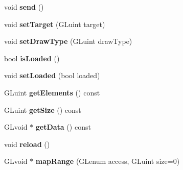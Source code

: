\begin{DoxyCompactItemize}
\item 
void {\bfseries send} ()\hypertarget{classflw_1_1flc_1_1IBuffer_a0fa4b45e543ed7f945f8d216628e7c53}{}\label{classflw_1_1flc_1_1IBuffer_a0fa4b45e543ed7f945f8d216628e7c53}

\item 
void {\bfseries set\+Target} (G\+Luint target)\hypertarget{classflw_1_1flc_1_1IBuffer_a7d73a5dcb2cc252fe329565a4c329433}{}\label{classflw_1_1flc_1_1IBuffer_a7d73a5dcb2cc252fe329565a4c329433}

\item 
void {\bfseries set\+Draw\+Type} (G\+Luint draw\+Type)\hypertarget{classflw_1_1flc_1_1IBuffer_a641903dd05dbe080d8f761ec55bffa97}{}\label{classflw_1_1flc_1_1IBuffer_a641903dd05dbe080d8f761ec55bffa97}

\item 
bool {\bfseries is\+Loaded} ()\hypertarget{classflw_1_1flc_1_1IBuffer_a5d6c3aea1c1ea096aa9f27197bb0cd64}{}\label{classflw_1_1flc_1_1IBuffer_a5d6c3aea1c1ea096aa9f27197bb0cd64}

\item 
void {\bfseries set\+Loaded} (bool loaded)\hypertarget{classflw_1_1flc_1_1IBuffer_a27fe03746857f00fb4631c73645a3a3a}{}\label{classflw_1_1flc_1_1IBuffer_a27fe03746857f00fb4631c73645a3a3a}

\item 
G\+Luint {\bfseries get\+Elements} () const \hypertarget{classflw_1_1flc_1_1IBuffer_aa7dc7de3135438e773925f58034125de}{}\label{classflw_1_1flc_1_1IBuffer_aa7dc7de3135438e773925f58034125de}

\item 
G\+Luint {\bfseries get\+Size} () const \hypertarget{classflw_1_1flc_1_1IBuffer_aa2ae6b3c9491fa3f5c3ca4d45b738215}{}\label{classflw_1_1flc_1_1IBuffer_aa2ae6b3c9491fa3f5c3ca4d45b738215}

\item 
G\+Lvoid $\ast$ {\bfseries get\+Data} () const \hypertarget{classflw_1_1flc_1_1IBuffer_a3962d189ef43bc43d247c5bff7ccc5e1}{}\label{classflw_1_1flc_1_1IBuffer_a3962d189ef43bc43d247c5bff7ccc5e1}

\item 
void {\bfseries reload} ()\hypertarget{classflw_1_1flc_1_1IBuffer_a3336186b4cabbfd41764d594856ea470}{}\label{classflw_1_1flc_1_1IBuffer_a3336186b4cabbfd41764d594856ea470}

\item 
G\+Lvoid $\ast$ {\bfseries map\+Range} (G\+Lenum access, G\+Luint size=0)\hypertarget{classflw_1_1flc_1_1IBuffer_a1a24ce0fc4b8c5bfcc684deb7173c493}{}\label{classflw_1_1flc_1_1IBuffer_a1a24ce0fc4b8c5bfcc684deb7173c493}


\end{DoxyCompactItemize}
